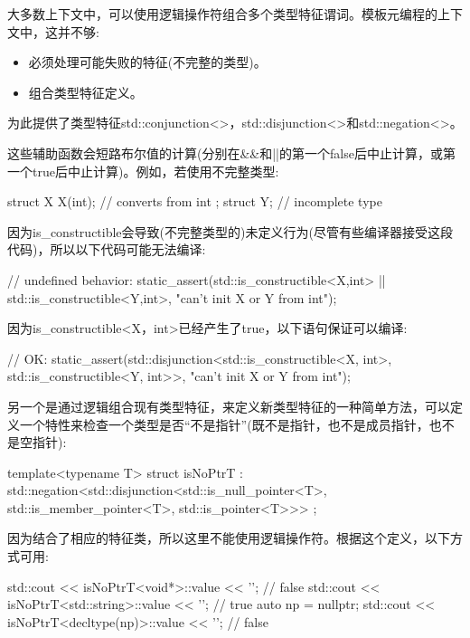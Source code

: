 
大多数上下文中，可以使用逻辑操作符组合多个类型特征谓词。模板元编程的上下文中，这并不够:

\begin{itemize}
\item 
必须处理可能失败的特征(不完整的类型)。

\item 
组合类型特征定义。
\end{itemize}

为此提供了类型特征std::conjunction<>，std::disjunction<>和std::negation<>。

这些辅助函数会短路布尔值的计算(分别在\&\&和||的第一个false后中止计算，或第一个true后中止计算)。例如，若使用不完整类型:

\begin{cpp}
struct X {
	X(int); // converts from int
};
struct Y; // incomplete type
\end{cpp}

因为is\_constructible会导致(不完整类型的)未定义行为(尽管有些编译器接受这段代码)，所以以下代码可能无法编译:

\begin{cpp}
// undefined behavior:
static_assert(std::is_constructible<X,int>{}
				|| std::is_constructible<Y,int>{},
			"can’t init X or Y from int");
\end{cpp}

因为is\_constructible<X，int>已经产生了true，以下语句保证可以编译:

\begin{cpp}
// OK:
static_assert(std::disjunction<std::is_constructible<X, int>,
								std::is_constructible<Y, int>>{},
			"can’t init X or Y from int");
\end{cpp}

另一个是通过逻辑组合现有类型特征，来定义新类型特征的一种简单方法，可以定义一个特性来检查一个类型是否“不是指针”(既不是指针，也不是成员指针，也不是空指针):

\begin{cpp}
template<typename T>
struct isNoPtrT : std::negation<std::disjunction<std::is_null_pointer<T>,
												std::is_member_pointer<T>,
												std::is_pointer<T>>>
{
};
\end{cpp}

因为结合了相应的特征类，所以这里不能使用逻辑操作符。根据这个定义，以下方式可用:

\begin{cpp}
std::cout << isNoPtrT<void*>::value << ’\n’; // false
std::cout << isNoPtrT<std::string>::value << ’\n’; // true
auto np = nullptr;
std::cout << isNoPtrT<decltype(np)>::value << ’\n’; // false
\end{cpp}

